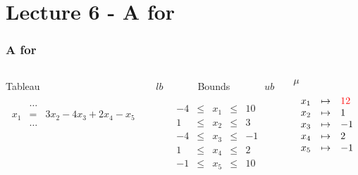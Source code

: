 \section{Lecture 6 - A \tsolver for \Lra}

\begin{frame}
  \frametitle{A \tsolver for \Lra}

  \scriptsize

  \begin{columns}

  \begin{column}{.4\textwidth}
  \begin{center}
  Tableau
  \end{center}
  $$
  \begin{array}{rcl}
    & \ldots \\                             
    x_1 & = & 3 x_2 - 4 x_3 + 2 x_4 - x_5 \\ 
    & \ldots \\                             
    \\
    \\
  \end{array}
  $$
  \end{column}

  \begin{column}{.3\textwidth}
  \begin{center}
  $lb$~~~~~~~Bounds~~~~~~~$ub$
  \end{center}
  $$
  \begin{array}{rcccl}
     -4 & \leq & x_1 & \leq & 10 \\
      1 & \leq & x_2 & \leq & 3 \\
     -4 & \leq & x_3 & \leq & -1 \\
      1 & \leq & x_4 & \leq & 2 \\
     -1 & \leq & x_5 & \leq & 10 \\
  \end{array}
  $$
  \end{column}

  \begin{column}{.3\textwidth}
  \begin{center}
  $\mu$
  \end{center}
  $$
  \begin{array}{rcl}
  x_1 & \mapsto & \textcolor{red}{12} \\
  x_2 & \mapsto & 1 \\
  x_3 & \mapsto & -1 \\
  x_4 & \mapsto & 2 \\
  x_5 & \mapsto & -1 
  \end{array}
  $$
  \end{column}


\end{columns}
\end{frame}
